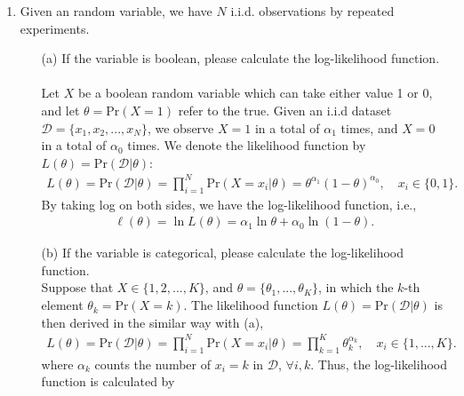 \documentclass[10pt]{article}
\newcommand{\pr}[1]{\text{Pr} #1}
\begin{document}
\begin{enumerate}[1.]
    \item Given an random variable, we have $N$ i.i.d. observations by repeated experiments.
          \begin{itemize}
              \item[(a)] If the variable is boolean, please calculate the log-likelihood function. ~\\
                    { \color{blue}
                    Let $X$ be a boolean random variable which can take either value 1 or 0,
                    and let $\theta = \pr(X = 1)$ refer to the true. Given an i.i.d dataset
                    $\mathcal{D} = \{ x_1,x_2,...,x_N\}$, we observe $X = 1$ in a total of $\alpha_1$ times, and $X = 0$
                    in a total of $\alpha_0$ times. We denote the likelihood function
                    by $L(\theta) = \pr(\mathcal{D}|\theta)$:
                    \begin{align*}
                        L(\theta) = \pr(\mathcal{D}|\theta) = \prod_{i=1}^N \pr(X=x_i|\theta) = \theta^{\alpha_1}(1-\theta)^{\alpha_0}, \quad x_i \in \{ 0,1\}.
                    \end{align*}
                    By taking log on both sides, we have the log-likelihood function, i.e.,
                    \begin{align*}
                        \ell(\theta) = \ln L(\theta) = \alpha_1\ln \theta + \alpha_0\ln (1-\theta).
                    \end{align*}
                    }
              \item[(b)] If the variable is categorical, please calculate the log-likelihood function. ~\\
                    { \color{blue}
                    Suppose that $X \in \{1,2,...,K\}$, and $\theta = \{\theta_1, ..., \theta_K\}$,
                    in which the $k$-th element $\theta_k = \pr (X = k)$. 
                    The likelihood function 
                    $L(\theta) = \pr(\mathcal{D}|\theta)$ is then derived in the similar way with (a),
                    \begin{align*}
                        L(\theta) = \pr(\mathcal{D}|\theta) = \prod_{i=1}^N \pr(X=x_i|\theta) = \prod_{k=1}^{K}\theta_k^{\alpha_k}, \quad x_i \in \{ 1,...,K\}.
                    \end{align*}
                    where $\alpha_k$ counts the number of $x_i = k$ in $\mathcal{D}$, $\forall i, k$. 
                    Thus, the log-likelihood function is calculated by
                    \begin{align*}

\end{align*}}
\end{itemize}
\end{enumerate}
\end{document}
